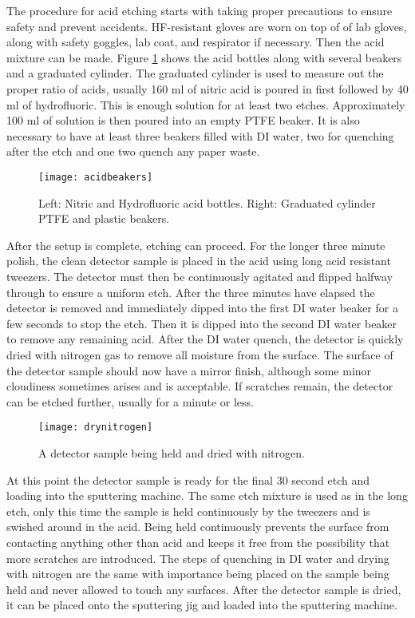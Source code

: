 The procedure for acid etching starts with taking proper precautions to ensure safety and prevent accidents.
HF-resistant gloves are worn on top of of lab gloves, along with safety goggles, lab coat, and respirator if necessary.
Then the acid mixture can be made.
Figure \ref{fig:acidbeakers} shows the acid bottles along with several beakers and a graduated cylinder.
The graduated cylinder is used to measure out the proper ratio of acids, usually 160 ml of nitric acid is poured in first followed by 40 ml of hydrofluoric.
This is enough solution for at least two etches.
Approximately 100 ml of solution is then poured into an empty PTFE beaker.
It is also necessary to have at least three beakers filled with DI water, two for quenching after the etch and one two quench any paper waste.
\begin{figure}[htpb]
\centering
\texttt{[image: acidbeakers]}
\caption{Left: Nitric and Hydrofluoric acid bottles. Right: Graduated cylinder PTFE and plastic beakers.}
\label{fig:acidbeakers}
\end{figure}
After the setup is complete, etching can proceed.
For the longer three minute polish, the clean detector sample is placed in the acid using long acid resistant tweezers.
The detector must then be continuously agitated and flipped halfway through to ensure a uniform etch.
After the three minutes have elapsed the detector is removed and immediately dipped into the first DI water beaker for a few seconds to stop the etch.
Then it is dipped into the second DI water beaker to remove any remaining acid.
After the DI water quench, the detector is quickly dried with nitrogen gas to remove all moisture from the surface.
The surface of the detector sample should now have a mirror finish, although some minor cloudiness sometimes arises and is acceptable.
If scratches remain, the detector can be etched further, usually for a minute or less.
\begin{figure}[htpb]
\centering
\texttt{[image: drynitrogen]}
\caption{A detector sample being held and dried with nitrogen.}
\label{fig:drynitrogen}
\end{figure}

At this point the detector sample is ready for the final 30 second etch and loading into the sputtering machine.
The same etch mixture is used as in the long etch, only this time the sample is held continuously by the tweezers and is swished around in the acid.
Being held continuously prevents the surface from contacting anything other than acid and keeps it free from the possibility that more scratches are introduced.
The steps of quenching in DI water and drying with nitrogen are the same with importance being placed on the sample being held and never allowed to touch any surfaces.
After the detector sample is dried, it can be placed onto the sputtering jig and loaded into the sputtering machine.


